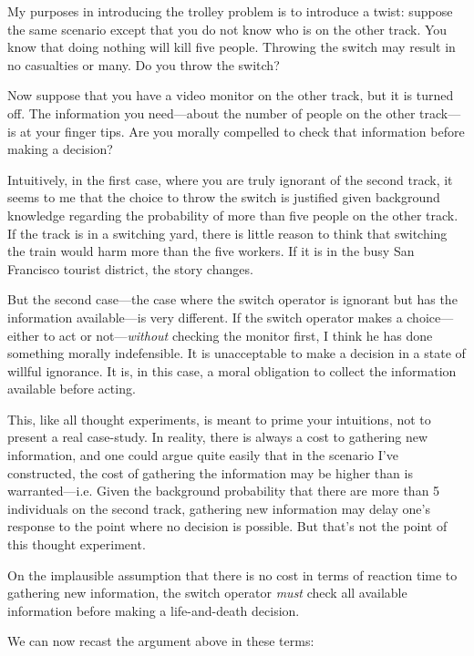 My purposes in introducing the trolley problem is to introduce a twist: suppose the same scenario except that you do not know who is on the other track. You know that doing nothing will kill five people. Throwing the switch may result in no casualties or many. Do you throw the switch?

Now suppose that you have a video monitor on the other track, but it is turned off. The information you need---about the number of people on the other track---is at your finger tips. Are you morally compelled to check that information before making a decision?

Intuitively, in the first case, where you are truly ignorant of the second track, it seems to me that the choice to throw the switch is justified given background knowledge regarding the probability of more than five people on the other track. If the track is in a switching yard, there is little reason to think that switching the train would harm more than the five workers. If it is in the busy San Francisco tourist district, the story changes.

But the second case---the case where the switch operator is ignorant but has the information available---is very different. If the switch operator makes a choice---either to act or not---\emph{without} checking the monitor first, I think he has done something morally indefensible. It is unacceptable to make a decision in a state of willful ignorance. It is, in this case, a moral obligation to collect the information available before acting.

This, like all thought experiments, is meant to prime your intuitions, not to present a real case-study. In reality, there is always a cost to gathering new information, and one could argue quite easily that in the scenario I've constructed, the cost of gathering the information may be higher than is warranted---i.e. Given the background probability that there are more than 5 individuals on the second track, gathering new information may delay one's response to the point where no decision is possible. But that's not the point of this thought experiment. 

On the implausible assumption that there is no cost in terms of reaction time to gathering new information, the switch operator \emph{must} check all available information before making a life-and-death decision.

We can now recast the argument above in these terms:

